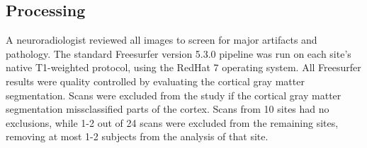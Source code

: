 \subsection{Processing}
 A neuroradiologist reviewed all images to screen for major artifacts and pathology. The standard Freesurfer\cite{freesurferPaper} version 5.3.0 pipeline was run on each site's native T1-weighted protocol, using the RedHat 7 operating system. All Freesurfer results were quality controlled by evaluating the cortical gray matter segmentation. Scans were excluded from the study if the cortical gray matter segmentation missclassified parts of the cortex. Scans from 10 sites had no exclusions, while 1-2 out of 24 scans were excluded from the remaining sites, removing at most 1-2 subjects from the analysis of that site.  